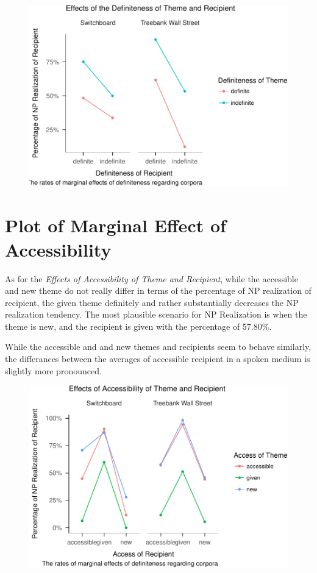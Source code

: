\documentclass[english,floatsintext,man]{apa6}
\theoremstyle{definition}
\theoremstyle{definition}
\theoremstyle{definition}
\theoremstyle{remark}
\begin{document}
\begin{figure}

{\centering \includegraphics{papaja_files/figure-latex/unnamed-chunk-1-1} 

}

\caption{ }\label{fig:unnamed-chunk-1}
\end{figure}

\section{Plot of Marginal Effect of
Accessibility}\label{plot-of-marginal-effect-of-accessibility}

As for the \emph{Effects of Accessibility of Theme and Recipient}, while
the accessible and new theme do not really differ in terms of the
percentage of NP realization of recipient, the given theme definitely
and rather substantially decreases the NP realization tendency. The most
plausible scenario for NP Realization is when the theme is new, and the
recipient is given with the percentage of 57.80\%.

While the accessible and and new themes and recipients seem to behave
similarly, the differances between the averages of accessible recipient
in a spoken medium is slightly more pronounced.

\begin{figure}
\centering
\includegraphics{papaja_files/figure-latex/acc_plots-1.pdf}
\caption{}
\end{figure}
\end{document}
